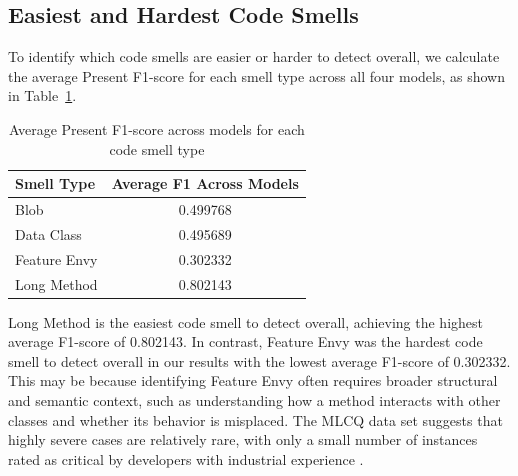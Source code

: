 \begin{table}[htbp]
\centering
\caption{Performance by code smell type using present-class F1-score}
\label{tab:smell-type-f1}
\small
{}
\end{table}

\subsection{Easiest and Hardest Code Smells}
\label{subsec:easiest-hardest-smells}

To identify which code smells are easier or harder to detect overall, we calculate the average Present F1-score for each smell type across all four models, as shown in Table~\ref{tab:average-smell-f1}.

\begin{table}[h]
\centering
\caption{Average Present F1-score across models for each code smell type}
\label{tab:average-smell-f1}
\begin{tabular}{lc}
\hline
Smell Type & Average F1 Across Models \\
\hline
Blob & 0.499768 \\
Data Class & 0.495689 \\
Feature Envy & 0.302332 \\
Long Method & 0.802143 \\
\hline
\end{tabular}
\end{table}

Long Method is the easiest code smell to detect overall, achieving the highest average F1-score of 0.802143. In contrast, Feature Envy was the hardest code smell to detect overall in our results  with the lowest average F1-score of 0.302332. This may be because identifying Feature Envy often requires broader structural and semantic context, such as understanding how a method interacts with other classes and whether its behavior is misplaced. The MLCQ data set suggests that highly severe cases are relatively rare, with only a small number of instances rated as critical by developers with industrial experience \cite{madeyski2020mlcq}.
